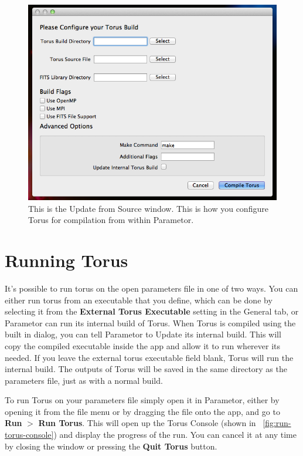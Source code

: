 \documentclass[a4paper,10pt]{article}
\newcommand{\figref}[2][\figurename~]{#1\ref{#2}}
\begin{document}
\begin{figure}
\centering
\includegraphics[width=12.5cm]{img/update-from-source.png}
\caption{This is the Update from Source window. This is how you configure Torus for compilation from within Parametor.}
\label{fig:update-from-source}
\end{figure}

\section{Running Torus}
It's possible to run torus on the open parameters file in one of two ways. You can either run torus from an executable that you define, which can be done by selecting it from the \textbf{External Torus Executable} setting in the General tab, or Parametor can run its internal build of Torus. When Torus is compiled using the built in dialog, you can tell Parametor to Update its internal build. This will copy the compiled executable inside the app and allow it to run wherever its needed. If you leave the external torus executable field blank, Torus will run the internal build. The outputs of Torus will be saved in the same directory as the parameters file, just as with a normal build.

To run Torus on your parameters file simply open it in Parametor, either by opening it from the file menu or by dragging the file onto the app, and go to \textbf{Run} $>$ \textbf{Run Torus}. This will open up the Torus Console (shown in \figref{fig:run-torus-console}) and display the progress of the run. You can cancel it at any time by closing the window or pressing the \textbf{Quit Torus} button.
\end{document}

